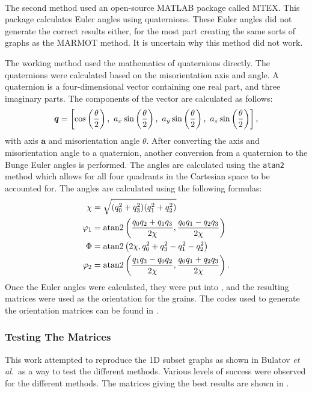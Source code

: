\documentclass[twoside,senior]{BYUPhys}
\begin{document}
The second method used an open-source MATLAB\textsuperscript{\textregistered} package called MTEX.\cite{bachmann2010}  This package calculates Euler angles using quaternions.  These Euler angles did not generate the correct results either, for the most part creating the same sorts of graphs as the MARMOT method.  It is uncertain why this method did not work.

The working method used the mathematics of quaternions directly.\cite{weisstein2004}  The quaternions were calculated based on the misorientation axis and angle.  A quaternion is a four-dimensional vector containing one real part, and three imaginary parts.  The components of the vector are calculated as follows:
\begin{equation}
\label{eq:quat}
\bm{q}=\left[\textnormal{cos}\left(\frac{\theta}{2}\right),\ a_x\,\textnormal{sin}\left(\frac{\theta}{2}\right),\ a_y\,\textnormal{sin}\left(\frac{\theta}{2}\right),\ a_z\,\textnormal{sin}\left(\frac{\theta}{2}\right)\right],
\end{equation}
with axis $\bm{a}$ and misorientation angle $\theta$.  After converting the axis and misorientation angle to a quaternion, another conversion from a quaternion to the Bunge Euler angles is performed.  The angles are calculated using the \lstinline!atan2! method which allows for all four quadrants in the Cartesian space to be accounted for.  The angles are calculated using the following formulas:
\begin{align}
\label{eq:quat2euler}
\begin{aligned}
\chi &= \sqrt{(q_0^2+q_3^2)(q_1^2+q_2^2)}\\
\varphi_1 &= \textnormal{atan2}\left(\frac{q_0q_2+q_1q_3}{2\chi}, \frac{q_0q_1-q_2q_3}{2\chi}\right)\\
\Phi &= \textnormal{atan2}\left(2\chi, q_0^2+q_3^2-q_1^2-q_2^2\right)\\
\varphi_2 &= \textnormal{atan2}\left(\frac{q_1q_3-q_0q_2}{2\chi}, \frac{q_0q_1+q_2q_3}{2\chi}\right).
\end{aligned}
\end{align}
Once the Euler angles were calculated, they were put into , and the resulting matrices were used as the orientation for the grains.  The codes used to generate the orientation matrices can be found in .

\subsubsection{Testing The Matrices\label{PQ:Testing}}
This work attempted to reproduce the 1D subset graphs as shown in Bulatov \emph{et al.}\ as a way to test the different methods.  Various levels of success were observed for the different methods.  The matrices giving the best results are shown in .
\end{document}
